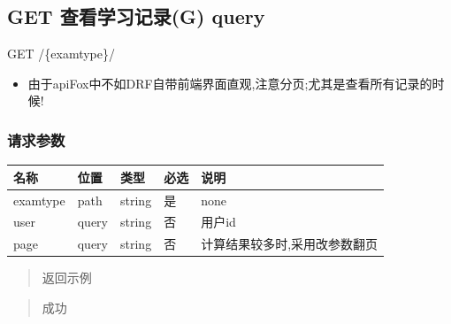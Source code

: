 \documentclass[
]{article}
\begin{document}
\hypertarget{get-ux67e5ux770bux5b66ux4e60ux8bb0ux5f55g-query}{%
\subsection{GET 查看学习记录(G)
query}\label{get-ux67e5ux770bux5b66ux4e60ux8bb0ux5f55g-query}}

GET /\{examtype\}/

\begin{itemize}
\item
  由于apiFox中不如DRF自带前端界面直观,注意分页;尤其是查看所有记录的时候!
\end{itemize}

\hypertarget{ux8bf7ux6c42ux53c2ux6570-13}{%
\subsubsection{请求参数}\label{ux8bf7ux6c42ux53c2ux6570-13}}

\begin{longtable}[]{@{}lllll@{}}
\toprule
名称 & 位置 & 类型 & 必选 & 说明 \\
\midrule
\endhead
examtype & path & string & 是 & none \\
user & query & string & 否 & 用户id \\
page & query & string & 否 & 计算结果较多时,采用改参数翻页 \\
\bottomrule
\end{longtable}

\begin{quote}
返回示例
\end{quote}

\begin{quote}
成功
\end{quote}
\end{document}

